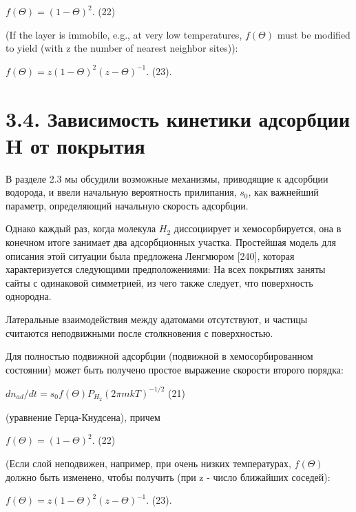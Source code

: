 \documentclass[11pt]{article}
\makeatletter
\newcommand{\boxspacing}{\kern\kvtcb@left@rule\kern\kvtcb@boxsep}
\newcommand{\prompt}[4]{
        {\ttfamily\llap{{\color{#2}[#3]:\hspace{3pt}#4}}\vspace{-\baselineskip}}
    }
\makeatother
\begin{document}
\(f\left(\Theta\right) = \left(1 - \Theta\right)^2\). (22)

(If the layer is immobile, e.g., at very low temperatures,
\(f\left(\Theta\right)\) must be modified to yield (with z the number of
nearest neighbor sites)):

\(f\left(\Theta\right) = z \left(1 - \Theta\right)^2 \left(z - \Theta\right)^{-1}\).
(23).

    \section{3.4. Зависимость кинетики адсорбции H от
покрытия}\label{ux437ux430ux432ux438ux441ux438ux43cux43eux441ux442ux44c-ux43aux438ux43dux435ux442ux438ux43aux438-ux430ux434ux441ux43eux440ux431ux446ux438ux438-h-ux43eux442-ux43fux43eux43aux440ux44bux442ux438ux44f}

    В разделе 2.3 мы обсудили возможные механизмы, приводящие к адсорбции
водорода, и ввели начальную вероятность прилипания, \(s_0\), как
важнейший параметр, определяющий начальную скорость адсорбции.

Однако каждый раз, когда молекула \(H_2\) диссоциирует и
хемосорбируется, она в конечном итоге занимает два адсорбционных
участка. Простейшая модель для описания этой ситуации была предложена
Ленгмюром {[}240{]}, которая характеризуется следующими предположениями:
На всех покрытиях заняты сайты с одинаковой симметрией, из чего также
следует, что поверхность однородна.

Латеральные взаимодействия между адатомами отсутствуют, и частицы
считаются неподвижными после столкновения с поверхностью.

Для полностью подвижной адсорбции (подвижной в хемосорбированном
состоянии) может быть получено простое выражение скорости второго
порядка:

\(dn_{ad} / dt = s_0 f\left(\Theta\right) P_{H_2} \left(2 \pi m k T\right)^{-1/2}\)
(21)

(уравнение Герца-Кнудсена), причем

\(f\left(\Theta\right) = \left(1 - \Theta\right)^2\). (22)

(Если слой неподвижен, например, при очень низких температурах,
\(f\left(\Theta\right)\) должно быть изменено, чтобы получить (при z -
число ближайших соседей):

\(f\left(\Theta\right) = z \left(1 - \Theta\right)^2 \left(z - \Theta\right)^{-1}\).
(23).

    \begin{tcolorbox}[breakable, size=fbox, boxrule=1pt, pad at break*=1mm,colback=cellbackground, colframe=cellborder]
\prompt{In}{incolor}{ }{\boxspacing}
\begin{Verbatim}[commandchars=\\\{\}]

\end{Verbatim}
\end{tcolorbox}
\end{document}
